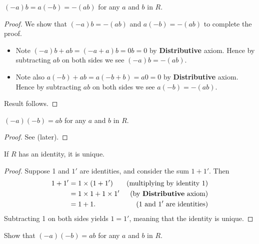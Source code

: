 \begin{proposition}\label{prop-product-of-element-and-additive-inverse-is-additive-inverse-of-product}
    $(-a)b = a(-b) = -(ab)$ for any $a$ and $b$ in $R$.
\end{proposition}
\begin{proof}
    We show that $(-a)b = -(ab)$ and $a(-b) = -(ab)$ to complete the proof.
    \begin{itemize}
        \item Note $(-a)b + ab = (-a + a)b = 0b = 0$ by \textbf{Distributive} axiom. Hence by subtracting $ab$ on both sides we see $(-a)b = -(ab)$.
        \item Note also $a(-b) + ab = a(-b + b) = a0 = 0$ by \textbf{Distributive} axiom. Hence by subtracting $ab$ on both sides we see $a(-b) = -(ab)$.
    \end{itemize}
    Result follows.
\end{proof}

\begin{proposition}
    $(-a)(-b) = ab$ for any $a$ and $b$ in $R$.
\end{proposition}
\begin{proof}
    See  (later).
\end{proof}

\begin{proposition}
    If $R$ has an identity, it is unique.
\end{proposition}
\begin{proof}
    Suppose 1 and $1'$ are identities, and consider the sum $1 + 1'$. Then
    \begin{align*}
        1 + 1' &= 1\times(1+1') & (\text{multiplying by identity }1)\\
        &= 1\times1 + 1\times1' & (\text{by \textbf{Distributive} axiom})\\
        &= 1 + 1. & (1 \text{ and } 1' \text{ are identities})
    \end{align*}
    Subtracting 1 on both sides yields $1 = 1'$, meaning that the identity is unique.
\end{proof}

\begin{exercise}\label{exercise-product-of-additive-inverses}
    Show that $(-a)(-b) = ab$ for any $a$ and $b$ in $R$.
\end{exercise}

